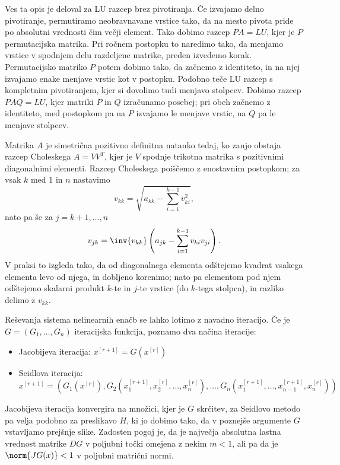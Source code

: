 Ves ta opis je deloval za LU razcep brez pivotiranja.
Če izvajamo delno pivotiranje, permutiramo neobravnavane vrstice tako, da na
mesto pivota pride po absolutni vrednosti čim večji element.
Tako dobimo razcep $PA = LU$, kjer je $P$ permutacijska matrika.
Pri ročnem postopku to naredimo tako, da menjamo vrstice v spodnjem delu
razdeljene matrike, preden izvedemo korak.
Permutacijsko matriko $P$ potem dobimo tako, da začnemo z identiteto, in na njej
izvajamo enake menjave vrstic kot v postopku.
Podobno teče LU razcep s kompletnim pivotiranjem, kjer si dovolimo tudi menjavo
stolpcev.
Dobimo razcep $PAQ = LU$, kjer matriki $P$ in $Q$ izračunamo posebej; pri obeh
začnemo z identiteto, med postopkom pa na $P$ izvajamo le menjave vrstic, na $Q$
pa le menjave stolpcev.


Matrika $A$ je simetrična pozitivno definitna natanko tedaj, ko zanjo obstaja
razcep Choleskega $A = V V^T$, kjer je $V$ spodnje trikotna matrika s
pozitivnimi diagonalnimi elementi.
Razcep Choleskega poiščemo z enostavnim postopkom; za vsak $k$ med $1$ in $n$
nastavimo
\[
  v_{kk} = \sqrt{a_{kk} - \sum_{i=1}^{k-1} v_{ki}^2},
\]
nato pa še za $j = k+1, \ldots, n$
\[
  v_{jk} = \inv{v_{kk}} \left( a_{jk} - \sum_{i=1}^{k-1} v_{ki} v_{ji} \right).
\]
V praksi to izgleda tako, da od diagonalnega elementa odštejemo kvadrat vsakega
elementa levo od njega, in dobljeno korenimo; nato pa elementom pod njem
odštejemo skalarni produkt $k$-te in $j$-te vrstice (do $k$-tega stolpca),
in razliko delimo z $v_{kk}$.


Reševanja sistema nelinearnih enačb se lahko lotimo z navadno iteracijo.
Če je $G = (G_1, \ldots, G_n)$ iteracijska funkcija, poznamo dva načina
iteracije:
\begin{itemize}
\item Jacobijeva iteracija: $x^{[r+1]} = G(x^{[r]})$
\item Seidlova iteracija: $x^{[r+1]} = (G_1(x^{[r]}), G_2(x_1^{[r+1]},
  x_2^{[r]}, \ldots, x_n^{[r]}), \ldots, G_n(x_1^{[r+1]}, \ldots,
  x_{n-1}^{[r+1]}, x_n^{[r]}))$
\end{itemize}
Jacobijeva iteracija konvergira na množici, kjer je $G$ skrčitev, za Seidlovo
metodo pa velja podobno za preslikavo $H$, ki jo dobimo tako, da v poznejše
argumente $G$ vstavljamo prejšnje slike.
Zadosten pogoj je, da je največja absolutna lastna vrednost matrike $DG$ v
poljubni točki omejena z nekim $m < 1$, ali pa da je $\norm{JG(x)} < 1$ v
poljubni matrični normi.

